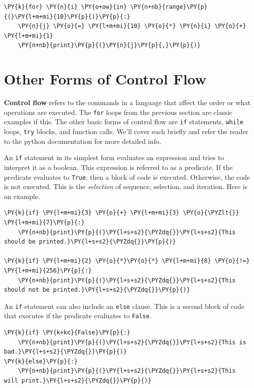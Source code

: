 \begin{Verbatim}[commandchars=\\\{\}]
\PY{k}{for} \PY{n}{i} \PY{o+ow}{in} \PY{n+nb}{range}\PY{p}{(}\PY{l+m+mi}{10}\PY{p}{)}\PY{p}{:}
    \PY{n}{j} \PY{o}{=} \PY{l+m+mi}{10} \PY{o}{*} \PY{n}{i} \PY{o}{+} \PY{l+m+mi}{1}
    \PY{n+nb}{print}\PY{p}{(}\PY{n}{j}\PY{p}{,}\PY{p}{)}
\end{Verbatim}


\section{Other Forms of Control Flow}


\textbf{Control flow} refers to the commands in a language that affect the order or what operations are executed.
The \texttt{for} loops from the previous section are classic examples if this.  The other basic forms of control flow are \texttt{if} statements, \texttt{while} loops,  \texttt{try} blocks, and function calls.  We’ll cover each briefly and refer the reader to the python documentation for more detailed info.


An \texttt{if} statement in its simplest form evaluates an expression and tries to interpret it as a boolean.  This expression is referred to as a predicate.  If the predicate evaluates to \texttt{True}, then a block of code is executed.  Otherwise, the code is not executed.  This is the \emph{selection} of sequence, selection, and iteration.  Here is an example.

\begin{Verbatim}[commandchars=\\\{\}]
\PY{k}{if} \PY{l+m+mi}{3} \PY{o}{+} \PY{l+m+mi}{3} \PY{o}{\PYZlt{}} \PY{l+m+mi}{7}\PY{p}{:}
    \PY{n+nb}{print}\PY{p}{(}\PY{l+s+s2}{\PYZdq{}}\PY{l+s+s2}{This should be printed.}\PY{l+s+s2}{\PYZdq{}}\PY{p}{)}

\PY{k}{if} \PY{l+m+mi}{2} \PY{o}{*}\PY{o}{*} \PY{l+m+mi}{8} \PY{o}{!=} \PY{l+m+mi}{256}\PY{p}{:}
    \PY{n+nb}{print}\PY{p}{(}\PY{l+s+s2}{\PYZdq{}}\PY{l+s+s2}{This should not be printed.}\PY{l+s+s2}{\PYZdq{}}\PY{p}{)}
\end{Verbatim}



An \texttt{if} statement can also include an \texttt{else} clause.  This is a second block of code that executes if the predicate evaluates to \texttt{False}.

\begin{Verbatim}[commandchars=\\\{\}]
\PY{k}{if} \PY{k+kc}{False}\PY{p}{:}
    \PY{n+nb}{print}\PY{p}{(}\PY{l+s+s2}{\PYZdq{}}\PY{l+s+s2}{This is bad.}\PY{l+s+s2}{\PYZdq{}}\PY{p}{)}
\PY{k}{else}\PY{p}{:}
    \PY{n+nb}{print}\PY{p}{(}\PY{l+s+s2}{\PYZdq{}}\PY{l+s+s2}{This will print.}\PY{l+s+s2}{\PYZdq{}}\PY{p}{)}
\end{Verbatim}



